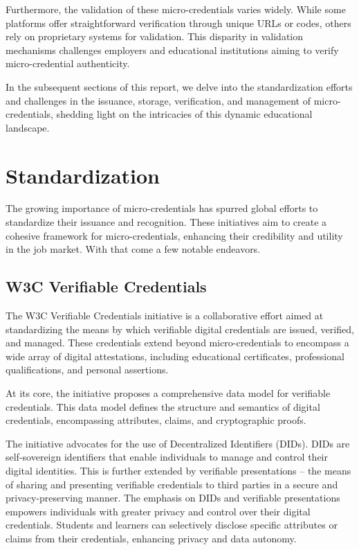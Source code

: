 \documentclass{article}
\begin{document}
\begin{multicols}{2}
    Furthermore, the validation of these micro-credentials varies widely. While some platforms offer straightforward verification through unique URLs or codes, others rely on proprietary systems for validation. This disparity in validation mechanisms challenges employers and educational institutions aiming to verify micro-credential authenticity.

    In the subsequent sections of this report, we delve into the standardization efforts and challenges in the issuance, storage, verification, and management of micro-credentials, shedding light on the intricacies of this dynamic educational landscape.

    \section{Standardization}

    The growing importance of micro-credentials has spurred global efforts to standardize their issuance and recognition. These initiatives aim to create a cohesive framework for micro-credentials, enhancing their credibility and utility in the job market. With that come a few notable endeavors.

    \subsection{W3C Verifiable Credentials}
    The W3C Verifiable Credentials initiative is a collaborative effort aimed at standardizing the means by which verifiable digital credentials are issued, verified, and managed. These credentials extend beyond micro-credentials to encompass a wide array of digital attestations, including educational certificates, professional qualifications, and personal assertions.

    At its core, the initiative proposes a comprehensive data model for verifiable credentials. This data model defines the structure and semantics of digital credentials, encompassing attributes, claims, and cryptographic proofs.

    The initiative advocates for the use of Decentralized Identifiers (DIDs). DIDs are self-sovereign identifiers that enable individuals to manage and control their digital identities. This is further extended by verifiable presentations -- the means of sharing and presenting verifiable credentials to third parties in a secure and privacy-preserving manner. The emphasis on DIDs and verifiable presentations empowers individuals with greater privacy and control over their digital credentials. Students and learners can selectively disclose specific attributes or claims from their credentials, enhancing privacy and data autonomy.


\end{multicols}
\end{document}
